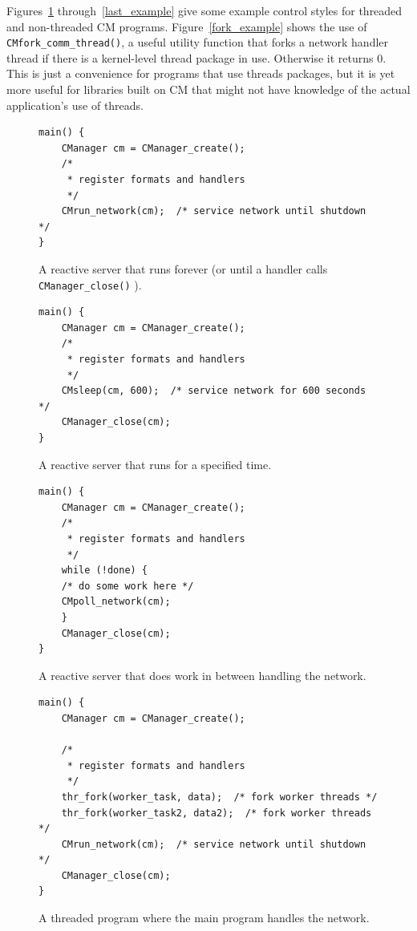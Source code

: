 \documentclass[11pt]{article}
\begin{document}
Figures~\ref{first_example} through~\ref{last_example} give some example
control styles for threaded and non-threaded CM programs.
Figure~\ref{fork_example} shows the use of {\tt CMfork\_comm\_thread()}, a
useful utility function that forks a network handler thread if there is a
kernel-level thread package in use.  Otherwise it returns 0.  This is just a
convenience for programs that use threads packages, but it is yet more
useful for libraries built on CM that might not have knowledge of the actual
application's use of threads.
\begin{figure}[p]
\center\begin{BVerbatim}
main() {
    CManager cm = CManager_create();
    /* 
     * register formats and handlers
     */
    CMrun_network(cm);  /* service network until shutdown */
}
\end{BVerbatim}
\caption{A reactive server that runs forever (or until a handler calls {\tt
CManager\_close()} ).\label{first_example}}
\end{figure}
\begin{figure}
\center\begin{BVerbatim}
main() {
    CManager cm = CManager_create();
    /*
     * register formats and handlers
     */
    CMsleep(cm, 600);  /* service network for 600 seconds */
    CManager_close(cm);
}
\end{BVerbatim}
\caption{A reactive server that runs for a specified time.}
\end{figure}
\begin{figure}
\center\begin{BVerbatim}
main() {
    CManager cm = CManager_create();
    /*
     * register formats and handlers
     */
    while (!done) {
	/* do some work here */
	CMpoll_network(cm);
    }
    CManager_close(cm);
}
\end{BVerbatim}
\caption{A reactive server that does work in between handling the network.}
\end{figure}
\begin{figure}
\center\begin{BVerbatim}
main() {
    CManager cm = CManager_create();

    /*
     * register formats and handlers
     */
    thr_fork(worker_task, data);  /* fork worker threads */
    thr_fork(worker_task2, data2);  /* fork worker threads */
    CMrun_network(cm);  /* service network until shutdown */
    CManager_close(cm);
}
\end{BVerbatim}
\caption{A threaded program where the main program handles the network.}
\end{figure}
\end{document}
